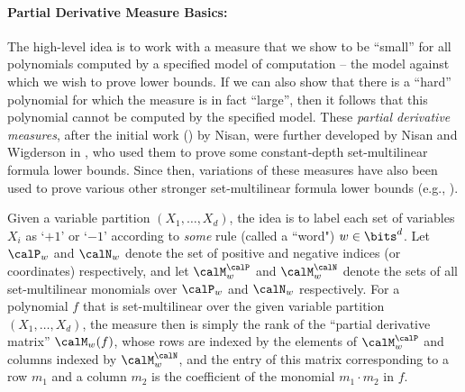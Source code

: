 \documentclass{article}
\begin{document}
\paragraph{Partial Derivative Measure Basics:}
The high-level idea is to work with a {measure} that we show to be ``small'' for all polynomials computed by a specified model of computation -- the model against which we wish to prove lower bounds. If we can also show that there is a ``hard'' polynomial for which the measure is in fact ``large'', then it follows that this polynomial cannot be computed by the specified model. These \emph{partial derivative measures}, after the initial work (\cite{Nisan91}) by Nisan, were further developed by 
Nisan and Wigderson in \cite{NisanW97}, who used them to prove some constant-depth set-multilinear formula lower bounds. Since then, variations of these measures have also been used to prove various other stronger set-multilinear {formula} lower bounds (e.g., \cite{LST1, LST2, LST3, mfcs/BhargavDS22, KushS22, KushS23}).

Given a variable partition $(X_1,\ldots, X_d)$, the idea is to label each set of variables $X_i$ as `$+1$' or `$-1$' according to \emph{some} rule (called a ``word") $w\in \bits^d$. Let $\calP_w$ and $\calN_w$ denote the set of positive and negative indices (or coordinates) respectively, and let $\calM_w^\calP$ and $\calM_w^\calN$ denote the sets of all set-multilinear monomials over $\calP_w$ and $\calN_w$ respectively. For a polynomial $f$ that is set-multilinear over the given variable partition $(X_1,\ldots, X_d)$, the measure then is simply the rank of the ``partial derivative matrix'' $\calM_w(f)$, whose rows are indexed by the elements
of $\calM_w^{\calP}$ and columns indexed by $\calM_w^{\calN}$, and the entry of this matrix corresponding to a
row $m_1$ and a column $m_2$ is the coefficient of the monomial $m_1\cdot m_2$ in $f$. 
\end{document}
